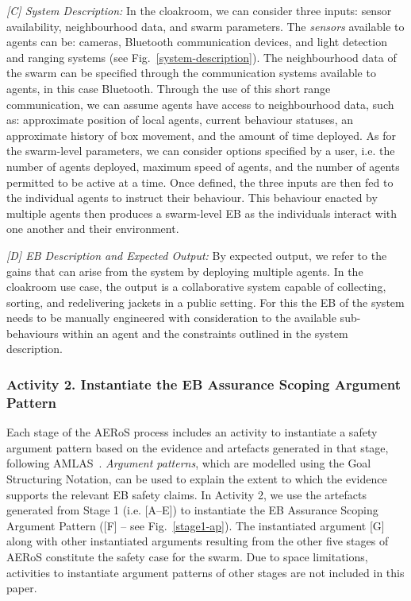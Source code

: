 \documentclass[runningheads]{llncs}
\begin{document}
\emph{[C] System Description:}
In the cloakroom, we can consider three inputs: sensor availability, neighbourhood data, and swarm parameters. 
The \emph{sensors} available to agents can be: cameras, Bluetooth communication devices, and light detection and ranging systems (see Fig.~\ref{system-description}). 
The neighbourhood data of the swarm can be specified through the communication systems available to agents, in this case Bluetooth. 
Through the use of this short range communication, we can assume agents have access to neighbourhood data, such as: approximate position of local agents, current behaviour statuses, an approximate history of box movement, and the amount of time deployed. 
As for the swarm-level parameters, we can consider options specified by a user, i.e. the number of agents deployed, maximum speed of agents, and the number of agents permitted to be active at a time.
Once defined, the three inputs are then fed to the individual agents to instruct their behaviour. This behaviour enacted by multiple agents then produces a swarm-level EB as the individuals interact with one another and their environment.

\emph{[D] EB Description and Expected Output:}
By expected output, we refer to the gains that can arise from the system by deploying multiple agents. 
In the cloakroom use case, the output is a collaborative system capable of collecting, sorting, and redelivering jackets in a public setting. 
For this the EB of the system needs to be manually engineered with consideration to the available sub-behaviours within an agent and the constraints outlined in the system description.

\subsubsection*{Activity 2. Instantiate the EB Assurance Scoping Argument Pattern}
Each stage of the AERoS process includes an activity to instantiate a safety argument pattern based on the evidence and artefacts generated in that stage, following AMLAS~\cite{Hawkins2021}. 
\emph{Argument patterns}, which are modelled using the Goal Structuring Notation, can be used to explain the extent to which the evidence supports the relevant EB safety claims.  
In Activity 2, we use the artefacts generated from Stage 1 (i.e. [A–E]) to instantiate the EB Assurance Scoping Argument Pattern ([F] – see Fig.~\ref{stage1-ap}). 
The instantiated argument [G] along with other instantiated arguments resulting from the other five stages of AERoS constitute the safety case for the swarm. 
Due to space limitations, activities to instantiate argument patterns of other stages are not included in this paper.
\end{document}
